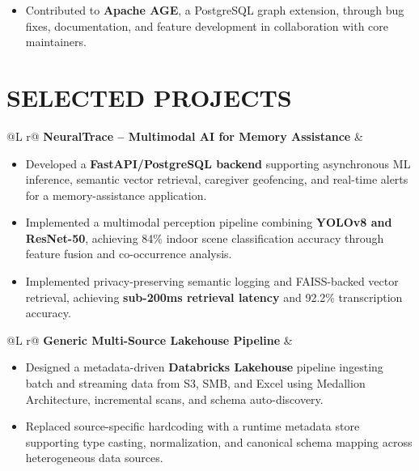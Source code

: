 \documentclass[a4paper,9pt]{article}
\begin{document}
\begin{itemize}
    \item Contributed to \textbf{Apache AGE}, a PostgreSQL graph extension, through bug fixes, documentation, and feature development in collaboration with core maintainers.
\end{itemize}


\section{SELECTED PROJECTS}

\begin{tabularx}{\linewidth}{@{}L r@{}}
\textbf{NeuralTrace -- Multimodal AI for Memory Assistance}
&
\\[-2pt]
\end{tabularx}

\begin{itemize}
    \item Developed a \textbf{FastAPI/PostgreSQL backend} supporting asynchronous ML inference, semantic vector retrieval, caregiver geofencing, and real-time alerts for a memory-assistance application.

    \item Implemented a multimodal perception pipeline combining \textbf{YOLOv8 and ResNet-50}, achieving 84\% indoor scene classification accuracy through feature fusion and co-occurrence analysis.

    \item Implemented privacy-preserving semantic logging and FAISS-backed vector retrieval, achieving \textbf{sub-200ms retrieval latency} and 92.2\% transcription accuracy.
\end{itemize}

\begin{tabularx}{\linewidth}{@{}L r@{}}
\textbf{Generic Multi-Source Lakehouse Pipeline}
&
\\[-2pt]
\end{tabularx}

\begin{itemize}
    \item Designed a metadata-driven \textbf{Databricks Lakehouse} pipeline ingesting batch and streaming data from S3, SMB, and Excel using Medallion Architecture, incremental scans, and schema auto-discovery.

    \item Replaced source-specific hardcoding with a runtime metadata store supporting type casting, normalization, and canonical schema mapping across heterogeneous data sources.
\end{itemize}
\end{document}
